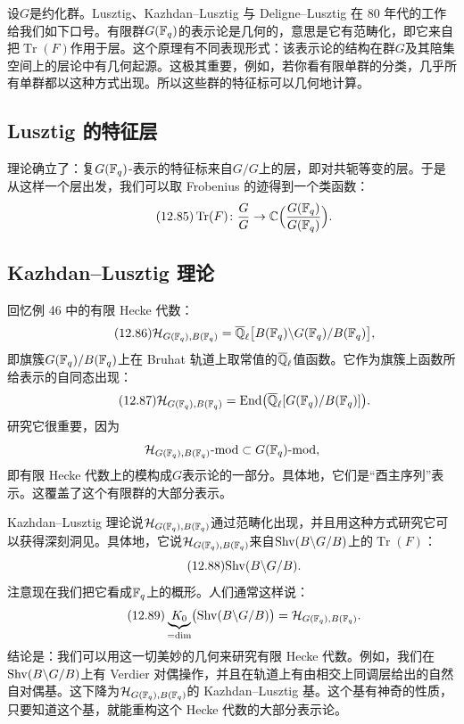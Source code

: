 设$G$是约化群。Lusztig、Kazhdan–Lusztig 与 Deligne–Lusztig 在 80 年代的工作给我们如下口号。有限群$G(\mathbb{F}_{q})$的表示论是几何的，意思是它有范畴化，即它来自把$\operatorname{Tr}(F)$作用于层。这个原理有不同表现形式：该表示论的结构在群$G$及其陪集空间上的层论中有几何起源。这极其重要，例如，若你看有限单群的分类，几乎所有单群都以这种方式出现。所以这些群的特征标可以几何地计算。

\subsection{Lusztig 的特征层}\label{sec:12-7-2}

理论确立了：复$G(\mathbb{F}_{q})$-表示的特征标来自$G/G$上的层，即对共轭等变的层。于是从这样一个层出发，我们可以取 Frobenius 的迹得到一个类函数：
\begin{equation}\tag{12.85}
\operatorname{Tr}(F)\colon\frac{G}{G}\to\mathbb{C}\Bigl(\frac{G(\mathbb{F}_{q})}{G(\mathbb{F}_{q})}\Bigr).
\end{equation}

\subsection{Kazhdan–Lusztig 理论}\label{sec:12-7-3}

回忆例 46 中的有限 Hecke 代数：
\begin{equation}\tag{12.86}
\mathcal{H}_{G(\mathbb{F}_{q}),B(\mathbb{F}_{q})}=\overline{\mathbb{Q}}_{\ell}\bigl[B(\mathbb{F}_{q})\backslash G(\mathbb{F}_{q})/B(\mathbb{F}_{q})\bigr],
\end{equation}
即旗簇$G(\mathbb{F}_{q})/B(\mathbb{F}_{q})$上在 Bruhat 轨道上取常值的$\overline{\mathbb{Q}}_{\ell}$值函数。它作为旗簇上函数所给表示的自同态出现：
\begin{equation}\tag{12.87}
\mathcal{H}_{G(\mathbb{F}_{q}),B(\mathbb{F}_{q})}=\mathrm{End}\bigl(\overline{\mathbb{Q}}_{\ell}[G(\mathbb{F}_{q})/B(\mathbb{F}_{q})]\bigr).
\end{equation}
研究它很重要，因为
\begin{equation*}
\mathcal{H}_{G(\mathbb{F}_{q}),B(\mathbb{F}_{q})}\text{-}\mathrm{mod}\subset G(\mathbb{F}_{q})\text{-}\mathrm{mod},
\end{equation*}
即有限 Hecke 代数上的模构成$G$表示论的一部分。具体地，它们是“酉主序列”表示。这覆盖了这个有限群的大部分表示。

Kazhdan–Lusztig 理论说$\mathcal{H}_{G(\mathbb{F}_{q}),B(\mathbb{F}_{q})}$通过范畴化出现，并且用这种方式研究它可以获得深刻洞见。具体地，它说$\mathcal{H}_{G(\mathbb{F}_{q}),B(\mathbb{F}_{q})}$来自$\mathrm{Shv}(B\backslash G/B)$上的$\operatorname{Tr}(F)$：
\begin{equation}\tag{12.88}
\mathrm{Shv}(B\backslash G/B).
\end{equation}
注意现在我们把它看成$\mathbb{F}_{q}$上的概形。人们通常这样说：
\begin{equation}\tag{12.89}
\underbrace{K_0}_{=\dim}\bigl(\mathrm{Shv}(B\backslash G/B)\bigr)=\mathcal{H}_{G(\mathbb{F}_{q}),B(\mathbb{F}_{q})}.
\end{equation}
结论是：我们可以用这一切美妙的几何来研究有限 Hecke 代数。例如，我们在$\mathrm{Shv}(B\backslash G/B)$上有 Verdier 对偶操作，并且在轨道上有由相交上同调层给出的自然自对偶基。这下降为$\mathcal{H}_{G(\mathbb{F}_{q}),B(\mathbb{F}_{q})}$的 Kazhdan–Lusztig 基。这个基有神奇的性质，只要知道这个基，就能重构这个 Hecke 代数的大部分表示论。

